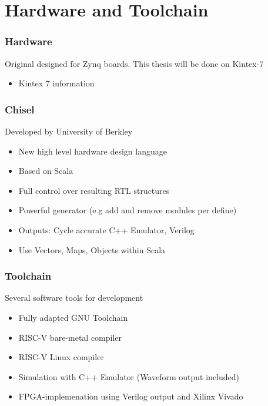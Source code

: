 \documentclass{beamer}
\begin{document}
\section{Hardware and Toolchain}
\begin{frame}
	\frametitle{Hardware}
	Original designed for Zynq boards. This thesis will be done on Kintex-7
	\begin{itemize}
			\item Kintex 7 information
		\end{itemize}
\end{frame}

\begin{frame}
	\frametitle{Chisel}
	Developed by University of Berkley
	\begin{itemize}
		\item New high level hardware design language
		\item Based on Scala
		\item Full control over resulting RTL structures
		\item Powerful generator (e.g add and remove modules per define)
		\item Outputs: Cycle accurate C++ Emulator, Verilog
		\item Use Vectors, Maps, Objects within Scala
	\end{itemize}
\end{frame}

\begin{frame}
	\frametitle{Toolchain}
	Several software tools for development
	\begin{itemize}
		\item Fully adapted GNU Toolchain
		\item RISC-V bare-metal compiler
		\item RISC-V Linux compiler
		\item Simulation with C++ Emulator (Waveform output included)
		\item FPGA-implemenation using Verilog output and Xilinx Vivado
	\end{itemize}
\end{frame}
\end{document}
